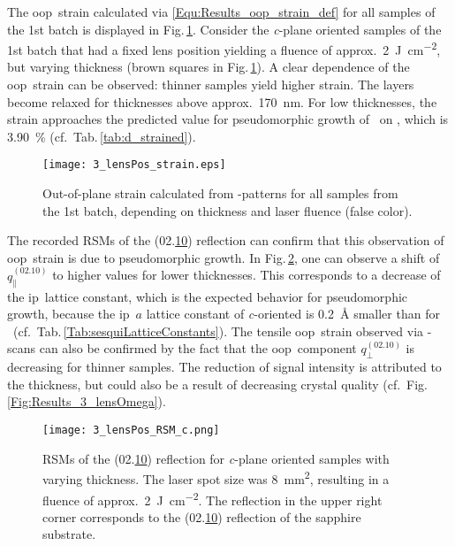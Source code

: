 The \gls{oop}\ strain calculated via \eqref{Equ:Results_oop_strain_def} for all samples of the 1st batch is displayed in Fig.\,\ref{Fig:Results_3_lensStrain}.
Consider the \textit{c}-plane oriented samples of the 1st batch that had a fixed lens position yielding a fluence of approx.\ \qty{2}{\joule\per\cm\squared}, but varying thickness (brown squares in Fig.\,\ref{Fig:Results_3_lensStrain}).
A clear dependence of the \gls{oop}\ strain can be observed: thinner samples yield higher strain.
The layers become relaxed for thicknesses above approx.\ \qty{170}{\nm}.
For low thicknesses, the strain approaches the predicted value for pseudomorphic growth of \cro\ on , which is \qty{3.90}{\percent} (cf.\ Tab.\,\ref{tab:d_strained}).
\begin{figure}
    \centering
    \texttt{[image: 3\_lensPos\_strain.eps]}
    \caption{
        Out-of-plane strain calculated from \thetaomega-patterns for all samples from the 1st batch, depending on thickness and laser fluence (false color).
    }
    \label{Fig:Results_3_lensStrain}
\end{figure}
The recorded \glspl{RSM} of the (02.\underline{10}) reflection can confirm that this observation of \gls{oop}\ strain is due to pseudomorphic growth.
In Fig.\,\ref{Fig:Results_3_cRSMs}, one can observe a shift of $q_\parallel^{(02.10)}$ to higher values for lower thicknesses.
This corresponds to a decrease of the \gls{ip}\ lattice constant, which is the expected behavior for pseudomorphic growth, because the \gls{ip}\ $a$ lattice constant of \textit{c}-oriented  is \qty{0.2}{\angstrom} smaller than for \cro\ (cf.~Tab.\,\ref{Tab:sesquiLatticeConstants}).
The tensile \gls{oop}\ strain observed via \thetaomega-scans can also be confirmed by the fact that the \gls{oop}\ component $q_\perp^{(02.10)}$ is decreasing for thinner samples.
The reduction of signal intensity is attributed to the thickness, but could also be a result of decreasing crystal quality (cf.~Fig.\,\ref{Fig:Results_3_lensOmega}).
\begin{figure}
    \centering
    \texttt{[image: 3\_lensPos\_RSM\_c.png]}
    \caption{
        \glspl{RSM} of the (02.\underline{10}) reflection for \textit{c}-plane oriented samples with varying thickness.
        The laser spot size was \qty{8}{\mm\squared}, resulting in a fluence of approx.\ \qty{2}{\J\per\cm\squared}.
        The reflection in the upper right corner corresponds to the (02.\underline{10}) reflection of the sapphire substrate.
    }
    \label{Fig:Results_3_cRSMs}
\end{figure}
